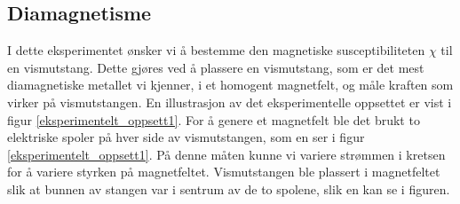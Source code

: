 \documentclass[%
 reprint,
 amsmath,amssymb,
 aps,
 norsk,
]{revtex4-1}
\begin{document}
\subsection{Diamagnetisme}
I dette eksperimentet ønsker vi å bestemme den magnetiske susceptibiliteten $\chi$ til en vismutstang. Dette gjøres ved å plassere en vismutstang, som er det mest diamagnetiske metallet vi kjenner, i et homogent magnetfelt, og måle kraften som virker på vismutstangen. En illustrasjon av det eksperimentelle oppsettet er vist i figur \vref{eksperimentelt_oppsett1}. For å genere et magnetfelt ble det brukt to elektriske spoler på hver side av vismutstangen, som en ser i figur \vref{eksperimentelt_oppsett1}. På denne måten kunne vi variere strømmen i kretsen for å variere styrken på magnetfeltet. Vismutstangen ble plassert i magnetfeltet slik at bunnen av stangen var i sentrum av de to spolene, slik en kan se i figuren.
\end{document}
